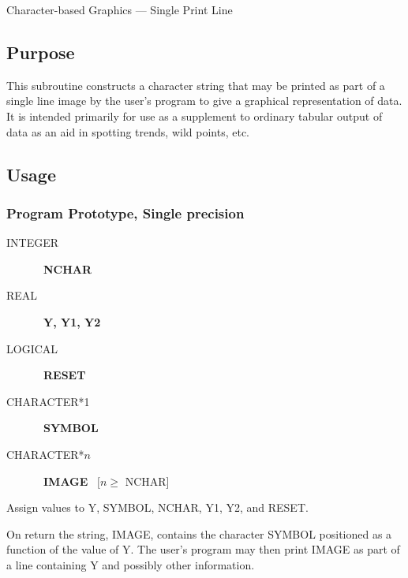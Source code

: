 \documentclass[twoside]{MATH77}
\begin{document}
  Character-based Graphics --- Single Print Line


\subsection{Purpose}

This subroutine constructs a character string that may be printed as part of a
single line image by the user's program to give a graphical representation of
data.  It is intended primarily for use as a supplement to ordinary tabular
output of data as an aid in spotting trends, wild points, etc.

\subsection{Usage}

\subsubsection{Program Prototype, Single precision}

\begin{description}

\item[INTEGER] \ {\bf NCHAR}

\item[REAL] \  {\bf Y, Y1, Y2}

\item[LOGICAL] \ {\bf RESET}

\item[CHARACTER*{\rm 1}] \ {\bf SYMBOL}

\item[CHARACTER*$n$] \ {\bf IMAGE} \ $[n \geq $ NCHAR]

\end{description}

Assign values to Y, SYMBOL, NCHAR, Y1, Y2, and RESET.

\begin{center}
\end{center}

On return the string, IMAGE, contains the character SYMBOL positioned as a
function of the value of Y.  The user's program may then print IMAGE as part
of a line containing Y and possibly other information.
\end{document}
